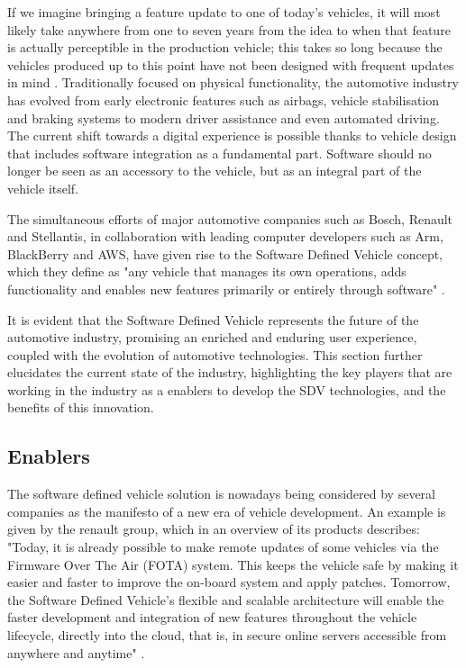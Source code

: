 If we imagine bringing a feature update to one of today's vehicles, it will most likely take anywhere from one to seven years from the idea to when that feature is actually perceptible in the production vehicle; this takes so long because the vehicles produced up to this point have not been designed with frequent updates in mind \cite{SDVBosch}.
Traditionally focused on physical functionality, the automotive industry has evolved from early electronic features such as airbags, vehicle stabilisation and braking systems to modern driver assistance and even automated driving. 
The current shift towards a digital experience is possible thanks to vehicle design that includes software integration as a fundamental part. Software should no longer be seen as an accessory to the vehicle, but as an integral part of the vehicle itself.

The simultaneous efforts of major automotive companies such as Bosch, Renault and Stellantis, in collaboration with leading computer developers such as Arm, BlackBerry and AWS, have given rise to the Software Defined Vehicle concept, which they define as "any vehicle that manages its own operations, adds functionality and enables new features primarily or entirely through software" \cite{blackberrySDV}.

It is evident that the Software Defined Vehicle represents the future of the automotive industry, promising an enriched and enduring user experience, coupled with the evolution of automotive technologies. This section further elucidates the current state of the industry, highlighting the key players that are working in the industry as a enablers to develop the SDV technologies, and  the benefits of this innovation.

\subsection{Enablers}
The software defined vehicle solution is nowadays being considered by several companies as the manifesto of a new era of vehicle development. An example is given by the renault group, which in an overview of its products describes: "Today, it is already possible to make remote updates of some vehicles via the Firmware Over The Air (FOTA) system. This keeps the vehicle safe by making it easier and faster to improve the on-board system and apply patches. Tomorrow, the Software Defined Vehicle's flexible and scalable architecture will enable the faster development and integration of new features throughout the vehicle lifecycle, directly into the cloud, that is, in secure online servers accessible from anywhere and anytime" \cite{SDVRenault}. 

